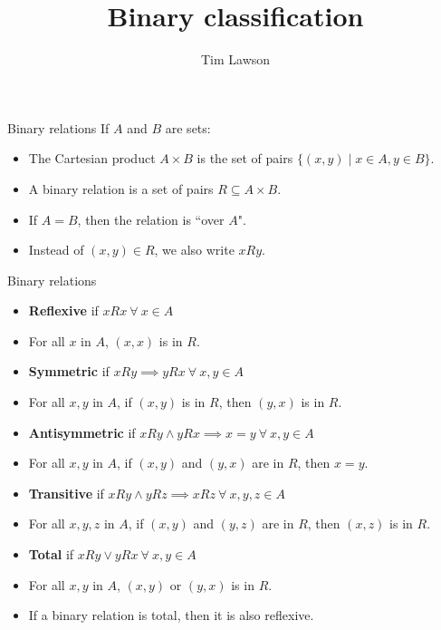 \documentclass[10pt]{beamer}
\title{Binary classification}
\author{Tim Lawson}
\begin{document}
\maketitle

\begin{frame}{Binary relations}
	If $A$ and $B$ are sets:
	\begin{itemize}
		\item The Cartesian product $A \times B$ is the set of pairs $\{(x, y) \mid x \in A, y \in B \}$.
		\item A binary relation is a set of pairs $R \subseteq A \times B$.
		\item If $A = B$, then the relation is ``over $A$".
		\item Instead of $(x, y) \in R$, we also write $xRy$.
	\end{itemize}
\end{frame}

\begin{frame}{Binary relations}
	\begin{itemize}
		\item \textbf{Reflexive} if $xRx\ \forall\ x \in A$
		\item[] For all $x$ in $A$, $(x, x)$ is in $R$.
		\item \textbf{Symmetric} if $xRy \implies yRx\ \forall\ x,y \in A$
		\item[] For all $x, y$ in $A$, if $(x, y)$ is in $R$, then $(y, x)$ is in $R$.
		\item \textbf{Antisymmetric} if $xRy \land yRx \implies x=y\ \forall\ x,y \in A$
		\item[] For all $x, y$ in $A$, if $(x, y)$ and $(y, x)$ are in $R$, then $x = y$.
		\item \textbf{Transitive} if $xRy \land yRz \implies xRz\ \forall\ x,y,z \in A$
		\item[] For all $x,y,z$ in $A$, if $(x, y)$ and $(y, z)$ are in $R$, then $(x, z)$ is in $R$.
		\item \textbf{Total} if $xRy \lor yRx\ \forall\ x,y \in A$
		\item[] For all $x, y$ in $A$, $(x, y)$ or $(y, x)$ is in $R$.
		\item[] If a binary relation is total, then it is also reflexive.
	\end{itemize}
\end{frame}
\end{document}
